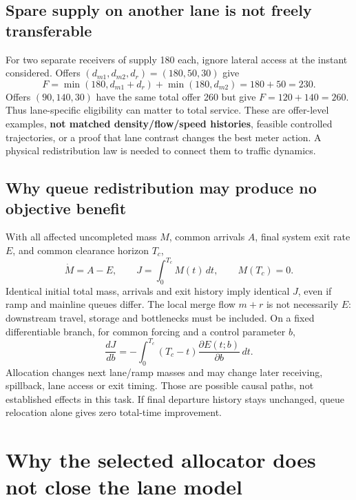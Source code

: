 \documentclass[10pt,a4paper]{article}
\begin{document}
\subsection*{Spare supply on another lane is not freely transferable}
For two separate receivers of supply 180 each, ignore lateral access at the
instant considered. Offers $(d_{m1},d_{m2},d_r)=(180,50,30)$ give
\begin{equation}
 F=\min(180,d_{m1}+d_r)+\min(180,d_{m2})=180+50=230.
\end{equation}
Offers $(90,140,30)$ have the same total offer 260 but give $F=120+140=260$.
Thus lane-specific eligibility can matter to total service. These are offer-level
examples, \textbf{not matched density/flow/speed histories}, feasible controlled
trajectories, or a proof that lane contrast changes the best meter action.
A physical redistribution law is needed to connect them to traffic dynamics.

\subsection*{Why queue redistribution may produce no objective benefit}
With all affected uncompleted mass $M$, common arrivals $A$, final system exit
rate $E$, and common clearance horizon $T_c$,
\begin{equation}
 \dot M=A-E,\qquad J=\int_0^{T_c}M(t)\,dt,\qquad M(T_c)=0.
\end{equation}
Identical initial total mass, arrivals and exit history imply identical $J$,
even if ramp and mainline queues differ. The local merge flow $m+r$ is not
necessarily $E$: downstream travel, storage and bottlenecks must be included.
On a fixed differentiable branch, for common forcing and a control parameter $b$,
\begin{equation}
 \frac{dJ}{db}=-\int_0^{T_c}(T_c-t)\frac{\partial E(t;b)}{\partial b}\,dt.
\end{equation}
Allocation changes next lane/ramp masses and may change later receiving,
spillback, lane access or exit timing. Those are possible causal paths, not
established effects in this task. If final departure history stays unchanged,
queue relocation alone gives zero total-time improvement.
\newpage

\section{Why the selected allocator does not close the lane model}
\end{document}
